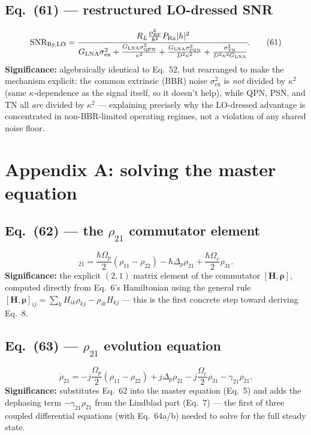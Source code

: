 \documentclass[11pt]{article}
\begin{document}
\subsection*{Eq.~(61) --- restructured LO-dressed SNR}
\begin{equation}
\text{SNR}_\text{Ry,LO} = \cfrac{R_L\frac{\wp_\text{RF}^2}{\hbar^2}P_\text{Rx}|h|^2}{G_\text{LNA}\sigma_\text{ex}^2+\frac{G_\text{LNA}\sigma_\text{QPN}^2}{\kappa^2}+\frac{G_\text{LNA}\sigma_\text{PSN}^2}{D^2\kappa^2}+\frac{\sigma_\text{TN}^2}{D^2\kappa^2G_\text{LNA}}}. \tag{61}
\end{equation}
\textbf{Significance:} algebraically identical to Eq.~52, but
rearranged to make the mechanism explicit: the common extrinsic
(BBR) noise $\sigma_\text{ex}^2$ is \emph{not} divided by $\kappa^2$
(same $\kappa$-dependence as the signal itself, so it doesn't help),
while QPN, PSN, and TN all \emph{are} divided by $\kappa^2$ ---
explaining precisely why the LO-dressed advantage is concentrated in
non-BBR-limited operating regimes, not a violation of any shared noise
floor.

\section{Appendix A: solving the master equation}

\subsection*{Eq.~(62) --- the $\rho_{21}$ commutator element}
\begin{equation}
[\mathbf H,\boldsymbol\rho]_{21} = \frac{\hbar\Omega_p}{2}(\rho_{11}-\rho_{22})-\hbar\Delta_p\rho_{21}+\frac{\hbar\Omega_c}{2}\rho_{31}. \tag{62}
\end{equation}
\textbf{Significance:} the explicit $(2,1)$ matrix element of the
commutator $[\mathbf H,\boldsymbol\rho]$, computed directly from
Eq.~6's Hamiltonian using the general rule
$[\mathbf H,\boldsymbol\rho]_{ij}=\sum_k H_{ik}\rho_{kj}-\rho_{ik}H_{kj}$
--- this is the first concrete step toward deriving Eq.~8.

\subsection*{Eq.~(63) --- $\rho_{21}$ evolution equation}
\begin{equation}
\dot\rho_{21} = -j\frac{\Omega_p}{2}(\rho_{11}-\rho_{22})+j\Delta_p\rho_{21}-j\frac{\Omega_c}{2}\rho_{31}-\gamma_{21}\rho_{21}. \tag{63}
\end{equation}
\textbf{Significance:} substitutes Eq.~62 into the master equation
(Eq.~5) and adds the dephasing term $-\gamma_{21}\rho_{21}$ from the
Lindblad part (Eq.~7) --- the first of three coupled differential
equations (with Eq.~64a/b) needed to solve for the full steady state.
\end{document}
